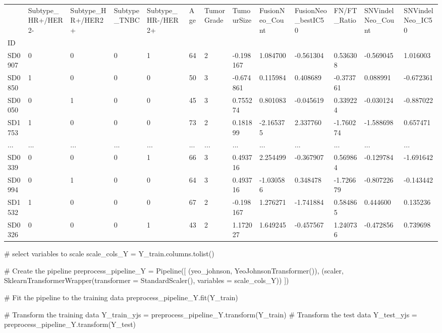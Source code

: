 \documentclass[
  letterpaper,
  DIV=11,
  numbers=noendperiod]{scrartcl}
\newenvironment{Shaded}{\begin{snugshade}}{\end{snugshade}}
\newcommand{\CommentTok}[1]{\textcolor[rgb]{0.37,0.37,0.37}{#1}}
\newcommand{\NormalTok}[1]{\textcolor[rgb]{0.00,0.23,0.31}{#1}}
\newcommand{\OperatorTok}[1]{\textcolor[rgb]{0.37,0.37,0.37}{#1}}
\newcommand{\StringTok}[1]{\textcolor[rgb]{0.13,0.47,0.30}{#1}}
\begin{document}
\begin{longtable}[]{@{}lllllllllllll@{}}
\toprule\noalign{}
& Subtype\_HR+/HER2- & Subtype\_HR+/HER2+ & Subtype\_TNBC &
Subtype\_HR-/HER2+ & Age & TumorGrade & TumourSize & FusionNeo\_Count &
FusionNeo\_bestIC50 & FN/FT\_Ratio & SNVindelNeo\_Count &
SNVindelNeo\_IC50 \\
ID & & & & & & & & & & & & \\
\midrule\noalign{}
\endhead
\bottomrule\noalign{}
\endlastfoot
SD0907 & 0 & 0 & 0 & 1 & 64 & 2 & -0.198167 & 1.084700 & -0.561304 &
0.536308 & -0.569045 & 1.016003 \\
SD0850 & 1 & 0 & 0 & 0 & 50 & 3 & -0.674861 & 0.115984 & 0.408689 &
-0.373761 & 0.088991 & -0.672361 \\
SD0050 & 0 & 1 & 0 & 0 & 45 & 3 & 0.755274 & 0.801083 & -0.045619 &
0.339224 & -0.030124 & -0.887022 \\
SD1753 & 1 & 0 & 0 & 0 & 73 & 2 & 0.181899 & -2.165375 & 2.337760 &
-1.760274 & -1.588698 & 0.657471 \\
... & ... & ... & ... & ... & ... & ... & ... & ... & ... & ... & ... &
... \\
SD0339 & 0 & 0 & 0 & 1 & 66 & 3 & 0.493716 & 2.254499 & -0.367907 &
0.569864 & -0.129784 & -1.691642 \\
SD0994 & 0 & 1 & 0 & 0 & 64 & 3 & 0.493716 & -1.030586 & 0.348478 &
-1.726679 & -0.807226 & -0.143442 \\
SD1532 & 1 & 0 & 0 & 0 & 67 & 2 & -0.198167 & 1.276271 & -1.741884 &
0.584865 & 0.444600 & 0.135236 \\
SD0326 & 0 & 0 & 0 & 1 & 43 & 2 & 1.172027 & 1.649245 & -0.457567 &
1.240736 & -0.472856 & 0.739698 \\
\end{longtable}

\begin{Shaded}
\begin{Highlighting}[]
\CommentTok{\# select variables to scale}
\NormalTok{scale\_cols\_Y }\OperatorTok{=}\NormalTok{ Y\_train.columns.tolist()}

\CommentTok{\# Create the pipeline}
\NormalTok{preprocess\_pipeline\_Y }\OperatorTok{=}\NormalTok{ Pipeline([}
\NormalTok{    (}\StringTok{\textquotesingle{}yeo\_johnson\textquotesingle{}}\NormalTok{, YeoJohnsonTransformer()),}
\NormalTok{    (}\StringTok{\textquotesingle{}scaler\textquotesingle{}}\NormalTok{, SklearnTransformerWrapper(transformer }\OperatorTok{=}\NormalTok{ StandardScaler(), variables }\OperatorTok{=}\NormalTok{ scale\_cols\_Y))}
\NormalTok{])}

\CommentTok{\# Fit the pipeline to the training data}
\NormalTok{preprocess\_pipeline\_Y.fit(Y\_train)}

\CommentTok{\# Transform the training data}
\NormalTok{Y\_train\_yjs }\OperatorTok{=}\NormalTok{ preprocess\_pipeline\_Y.transform(Y\_train)}
\CommentTok{\# Transform the test data}
\NormalTok{Y\_test\_yjs }\OperatorTok{=}\NormalTok{ preprocess\_pipeline\_Y.transform(Y\_test)}
\end{Highlighting}
\end{Shaded}
\end{document}
